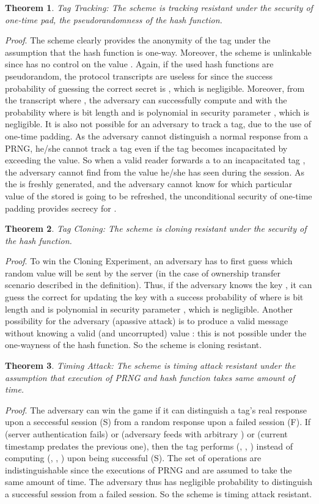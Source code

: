 \documentclass{easychair}
\newtheorem{theorem}{Theorem}{\bfseries}{\itshape}
\begin{document}
\begin{theorem}{Tag Tracking:}
The scheme is tracking resistant under the security of one-time pad, the pseudorandomness of the hash function.
\end{theorem}
\textit{Proof}. The scheme clearly provides the anonymity of the tag under the assumption that the hash function is one-way. Moreover, the scheme is unlinkable since  has no control on the value  . Again, if the used hash functions are pseudorandom, the protocol transcripts are useless for  since the success probability of guessing the correct secret is , which is negligible. Moreover, from the transcript  where , the adversary can successfully compute  and  with the probability  where  is bit length and is polynomial in security parameter , which is negligible. It is also not possible for an adversary to track a tag, due to the use of 
one-time padding. As the adversary cannot distinguish a normal response from a 
PRNG, he/she cannot track a tag even if the tag becomes incapacitated by exceeding the 
 value. So when a valid reader forwards a  to 
an incapacitated tag , the adversary cannot find  
from the value he/she has seen during the session. As the  is 
freshly generated, and the adversary cannot know for which particular value of 
 the stored  is going to be refreshed, the unconditional security of one-time padding 
provides secrecy for . 


\begin{theorem}{Tag Cloning:} 
The scheme is cloning resistant under the security of the hash function.
\end{theorem}
\textit{Proof}. To win the Cloning Experiment, an adversary has to first guess which random value  will be sent by the server (in the case of ownership transfer scenario described in the definition). Thus, if the adversary knows the key , it can guess the correct  for updating the key with a success probability of  where  is bit length and is polynomial in security parameter , which is negligible. Another
possibility for the adversary (apassive attack) is to produce a valid message  without knowing a valid (and uncorrupted) value : this is not possible under the one-wayness of the hash function. So the scheme is cloning resistant. 

\begin{theorem}{Timing Attack:} 
The scheme is timing attack resistant under the assumption that execution of PRNG and hash function takes same amount of time.
\end{theorem}
\textit{Proof}. The adversary can win the game if it can distinguish a tag's real response upon a seccessful session (S) from a random response upon a failed session (F). If  (server authentication fails) or  (adversary feeds with arbitrary ) or  (current timestamp predates the previous one), then the tag performs (, , ) instead of computing (, , ) upon being successful (S). The set of operations are indistinguishable since the executions of PRNG and  are assumed to take the same amount of time. The adversary thus has negligible probability to distinguish a successful session from a failed session. So the scheme is timing attack resistant. 
\end{document}
